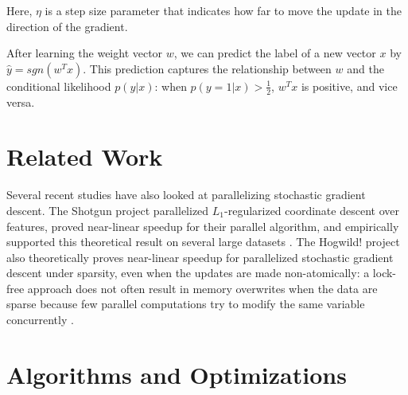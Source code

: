\documentclass{article}
\begin{document}
Here, $\eta$ is a step size parameter that indicates how far to move the update in the direction of the gradient.

After learning the weight vector $w$, we can predict the label of a new vector $x$ by $\hat{y} = sgn(w^Tx)$. This prediction captures the relationship between $w$ and the conditional likelihood $p(y|x)$: when $p(y = 1|x) > \frac{1}{2}$, $w^Tx$ is positive, and vice versa.

\section{Related Work}
Several recent studies have also looked at parallelizing stochastic gradient descent. The Shotgun project parallelized $L_1$-regularized coordinate descent over features, proved near-linear speedup for their parallel algorithm, and empirically supported this theoretical result on several large datasets \cite{shotgun2011}. The Hogwild! project also theoretically proves near-linear speedup for parallelized stochastic gradient descent under sparsity, even when the updates are made non-atomically: a lock-free approach does not often result in memory overwrites when the data are sparse because few parallel computations try to modify the same variable concurrently \cite{hogwild2011}.

\section{Algorithms and Optimizations}
\end{document}
